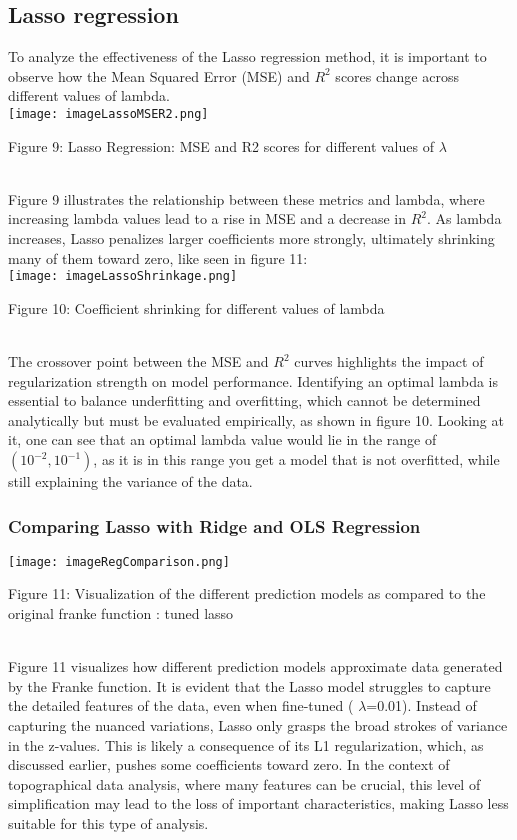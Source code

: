\documentclass{article}
\begin{document}
\begin{enumerate}
\subsection{Lasso regression}


To analyze the effectiveness of the Lasso regression method, it is important to observe how the Mean Squared Error (MSE) and \(R^2\) scores change across different values of lambda. \\

\texttt{[image: imageLassoMSER2.png]}
    \caption{Figure 9: Lasso Regression: MSE and R2 scores for different values of \(\lambda\)}
    \label{fig:enter-label}\\

Figure 9 illustrates the relationship between these metrics and lambda, where increasing lambda values lead to a rise in MSE and a decrease in \(R^2\). As lambda increases, Lasso penalizes larger coefficients more strongly, ultimately shrinking many of them toward zero, like seen in figure 11:\\

\texttt{[image: imageLassoShrinkage.png]}
    \caption{Figure 10: Coefficient shrinking for different values of lambda}
    \label{fig:enter-label}\\

The crossover point between the MSE and \(R^2\) curves highlights the impact of regularization strength on model performance. Identifying an optimal lambda is essential to balance underfitting and overfitting, which cannot be determined analytically but must be evaluated empirically, as shown in figure 10. Looking at it, one can see that an optimal lambda value would lie in the range of \((10^{-2}, 10^{-1})\), as it is in this range you get a model that is not overfitted, while still explaining the variance of the data. \\

\subsubsection{Comparing Lasso with Ridge and OLS Regression}

\texttt{[image: imageRegComparison.png]}
\caption{Figure 11: Visualization of the different prediction models as compared to the original franke function : tuned lasso}
\label{fig:enter-label}\\

Figure 11 visualizes how different prediction models approximate data generated by the Franke function. It is evident that the Lasso model struggles to capture the detailed features of the data, even when fine-tuned (
\(\lambda\)=0.01). Instead of capturing the nuanced variations, Lasso only grasps the broad strokes of variance in the z-values. This is likely a consequence of its L1 regularization, which, as discussed earlier, pushes some coefficients toward zero. In the context of topographical data analysis, where many features can be crucial, this level of simplification may lead to the loss of important characteristics, making Lasso less suitable for this type of analysis.\\


\end{enumerate}
\end{document}

